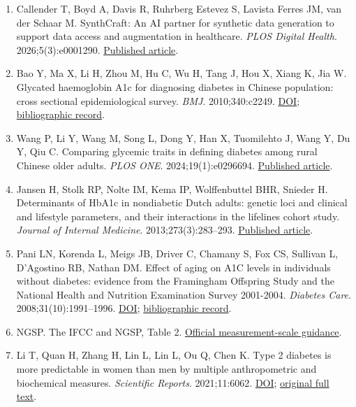 \documentclass[sigconf,anonymous,review]{acmart}
\begin{document}
\begin{enumerate}
\item Callender T, Boyd A, Davis R, Ruhrberg Estevez S, Lavista Ferres JM, van der Schaar M. SynthCraft: An AI partner for synthetic data generation to support data access and augmentation in healthcare. \emph{PLOS Digital Health}. 2026;5(3):e0001290. \href{https://journals.plos.org/digitalhealth/article?id=10.1371/journal.pdig.0001290}{Published article}.

\item Bao Y, Ma X, Li H, Zhou M, Hu C, Wu H, Tang J, Hou X, Xiang K, Jia W. Glycated haemoglobin A1c for diagnosing diabetes in Chinese population: cross sectional epidemiological survey. \emph{BMJ}. 2010;340:c2249. \href{https://doi.org/10.1136/bmj.c2249}{DOI}; \href{https://pubmed.ncbi.nlm.nih.gov/20478961/}{bibliographic record}.

\item Wang P, Li Y, Wang M, Song L, Dong Y, Han X, Tuomilehto J, Wang Y, Du Y, Qiu C. Comparing glycemic traits in defining diabetes among rural Chinese older adults. \emph{PLOS ONE}. 2024;19(1):e0296694. \href{https://journals.plos.org/plosone/article?id=10.1371/journal.pone.0296694}{Published article}.

\item Jansen H, Stolk RP, Nolte IM, Kema IP, Wolffenbuttel BHR, Snieder H. Determinants of HbA1c in nondiabetic Dutch adults: genetic loci and clinical and lifestyle parameters, and their interactions in the lifelines cohort study. \emph{Journal of Internal Medicine}. 2013;273(3):283–\allowbreak{}293. \href{https://onlinelibrary.wiley.com/doi/10.1111/joim.12010}{Published article}.

\item Pani LN, Korenda L, Meigs JB, Driver C, Chamany S, Fox CS, Sullivan L, D'Agostino RB, Nathan DM. Effect of aging on A1C levels in individuals without diabetes: evidence from the Framingham Offspring Study and the National Health and Nutrition Examination Survey 2001-2004. \emph{Diabetes Care}. 2008;31(10):1991–\allowbreak{}1996. \href{https://doi.org/10.2337/dc08-0577}{DOI}; \href{https://pubmed.ncbi.nlm.nih.gov/18628569/}{bibliographic record}.

\item NGSP. The IFCC and NGSP, Table 2. \href{https://ngsp.org/ifccngsp.asp}{Official measurement-scale guidance}.

\item Li T, Quan H, Zhang H, Lin L, Lin L, Ou Q, Chen K. Type 2 diabetes is more predictable in women than men by multiple anthropometric and biochemical measures. \emph{Scientific Reports}. 2021;11:6062. \href{https://doi.org/10.1038/s41598-021-85581-z}{DOI}; \href{https://pmc.ncbi.nlm.nih.gov/articles/PMC7960723/}{original full text}.


\end{enumerate}
\end{document}

